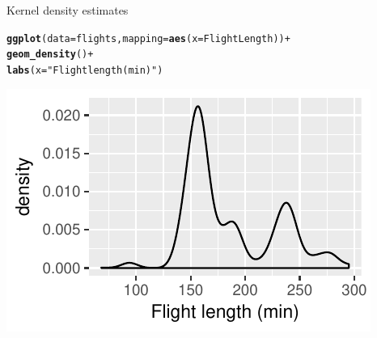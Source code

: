 \documentclass[10pt]{beamer}\usepackage[]{graphicx}\usepackage[]{color}
\makeatletter
\def\maxwidth{ %
  \ifdim\Gin@nat@width>\linewidth
    \linewidth
  \else
    \Gin@nat@width
  \fi
}
\newcommand{\hlstr}[1]{\textcolor[rgb]{0.192,0.494,0.8}{#1}}%
\newcommand{\hlopt}[1]{\textcolor[rgb]{0,0,0}{#1}}%
\newcommand{\hlstd}[1]{\textcolor[rgb]{0.345,0.345,0.345}{#1}}%
\newcommand{\hlkwc}[1]{\textcolor[rgb]{0.333,0.667,0.333}{#1}}%
\newcommand{\hlkwd}[1]{\textcolor[rgb]{0.737,0.353,0.396}{\textbf{#1}}}%
\newenvironment{kframe}{%
 \def\at@end@of@kframe{}%
 \ifinner\ifhmode%
  \def\at@end@of@kframe{\end{minipage}}%
  \begin{minipage}{\columnwidth}%
 \fi\fi%
 \def\FrameCommand##1{\hskip\@totalleftmargin \hskip-\fboxsep
 \colorbox{shadecolor}{##1}\hskip-\fboxsep
     \hskip-\linewidth \hskip-\@totalleftmargin \hskip\columnwidth}%
 \MakeFramed {\advance\hsize-\width
   \@totalleftmargin\z@ \linewidth\hsize
   \@setminipage}}%
 {\par\unskip\endMakeFramed%
 \at@end@of@kframe}
\newenvironment{knitrout}{}{} %
\makeatother
\begin{document}
\begin{frame}[fragile]{Kernel density estimates}

\begin{knitrout}\small
{}\color{fgcolor}\begin{kframe}
\begin{alltt}
\hlkwd{ggplot}\hlstd{(}\hlkwc{data} \hlstd{= flights,} \hlkwc{mapping} \hlstd{=} \hlkwd{aes}\hlstd{(}\hlkwc{x} \hlstd{= FlightLength))} \hlopt{+}
  \hlkwd{geom_density}\hlstd{()} \hlopt{+}
  \hlkwd{labs}\hlstd{(}\hlkwc{x} \hlstd{=} \hlstr{"Flight length (min)"}\hlstd{)}
\end{alltt}
\end{kframe}
\includegraphics[width=\maxwidth]{figure/unnamed-chunk-18-1} 

\end{knitrout}

\end{frame}
\end{document}
